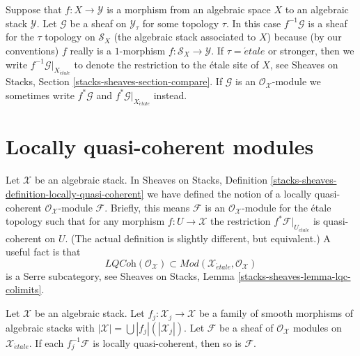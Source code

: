 \medskip\noindent
Suppose that $f : X \to \mathcal{Y}$ is a morphism from an algebraic
space $X$ to an algebraic stack $\mathcal{Y}$. Let $\mathcal{G}$ be
a sheaf on $\mathcal{Y}_\tau$ for some topology $\tau$. In this case
$f^{-1}\mathcal{G}$ is a sheaf for the $\tau$ topology on $\mathcal{S}_X$
(the algebraic stack associated to $X$) because (by our conventions) $f$
really is a $1$-morphism $f : \mathcal{S}_X \to \mathcal{Y}$.
If $\tau = \acute{e}tale$ or stronger, then we write
$f^{-1}\mathcal{G}|_{X_{\acute{e}tale}}$
to denote the restriction to the \'etale site of $X$, see
Sheaves on Stacks, Section \ref{stacks-sheaves-section-compare}.
If $\mathcal{G}$ is an $\mathcal{O}_\mathcal{X}$-module we sometimes
write $f^*\mathcal{G}$ and $f^*\mathcal{G}|_{X_{\acute{e}tale}}$
instead.




\section{Locally quasi-coherent modules}
\label{section-locally-quasi-coherent}

\noindent
Let $\mathcal{X}$ be an algebraic stack. In
Sheaves on Stacks, Definition
\ref{stacks-sheaves-definition-locally-quasi-coherent}
we have defined the notion of a locally quasi-coherent
$\mathcal{O}_\mathcal{X}$-module $\mathcal{F}$. Briefly, this means
$\mathcal{F}$ is an $\mathcal{O}_\mathcal{X}$-module for the
\'etale topology such that for any morphism $f : U \to \mathcal{X}$
the restriction $f^*\mathcal{F}|_{U_{\acute{e}tale}}$ is quasi-coherent
on $U$. (The actual definition is slightly different, but equivalent.)
A useful fact is that
$$
\textit{LQCoh}(\mathcal{O}_\mathcal{X}) \subset
\textit{Mod}(\mathcal{X}_{\acute{e}tale}, \mathcal{O}_\mathcal{X})
$$
is a Serre subcategory, see
Sheaves on Stacks, Lemma \ref{stacks-sheaves-lemma-lqc-colimits}.

\begin{lemma}
\label{lemma-check-lqc-on-etale-covering}
Let $\mathcal{X}$ be an algebraic stack. Let
$f_j : \mathcal{X}_j \to \mathcal{X}$ be a family of smooth
morphisms of algebraic stacks with
$|\mathcal{X}| =\bigcup |f_j|(|\mathcal{X}_j|)$.
Let $\mathcal{F}$ be a sheaf of $\mathcal{O}_\mathcal{X}$ modules
on $\mathcal{X}_{\acute{e}tale}$. If each $f_j^{-1}\mathcal{F}$
is locally quasi-coherent, then so is $\mathcal{F}$.
\end{lemma}


